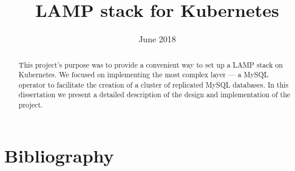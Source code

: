 \documentclass[licencjacka,en]{pracamgr}
\title{LAMP stack for Kubernetes}
\date{June 2018}
\begin{document}
  \maketitle

  \begin{abstract}
  This project’s purpose was to provide a convenient way to set up a LAMP 
  stack on Kubernetes. We focused on implementing the most complex layer 
  --- a MySQL operator to facilitate the creation of a cluster of replicated 
  MySQL databases. In this dissertation we present a detailed description of 
  the design and implementation of the project. 
  \end{abstract}

  \tableofcontents

  
  
  
  
  
  
  
  

  \chapter*{Bibliography}
  \printbibliography[heading=none]
\end{document}
